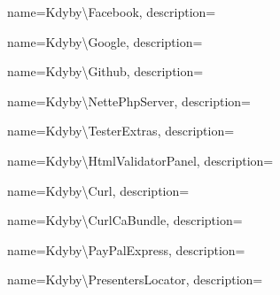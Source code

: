  {
  name={Kdy\-by\textbackslash{}Fa\-ce\-book},
  description={} }

 {
  name={Kdy\-by\textbackslash{}Google},
  description={} }

 {
  name={Kdy\-by\textbackslash{}Git\-hub},
  description={} }

 {
  name={Kdy\-by\textbackslash{}Nette\-Php\-Ser\-ver},
  description={} }

 {
  name={Kdy\-by\textbackslash{}Tes\-ter\-Ex\-tras},
  description={} }

 {
  name={Kdy\-by\textbackslash{}Html\-Va\-li\-da\-tor\-Pa\-nel},
  description={} }

 {
  name={Kdy\-by\textbackslash{}Curl},
  description={} }

 {
  name={Kdy\-by\textbackslash{}Curl\-Ca\-Bund\-le},
  description={} }

 {
  name={Kdy\-by\textbackslash{}Pay\-Pal\-Ex\-press},
  description={} }

 {
  name={Kdy\-by\textbackslash{}Pre\-sen\-ters\-Lo\-ca\-tor},
  description={} }

